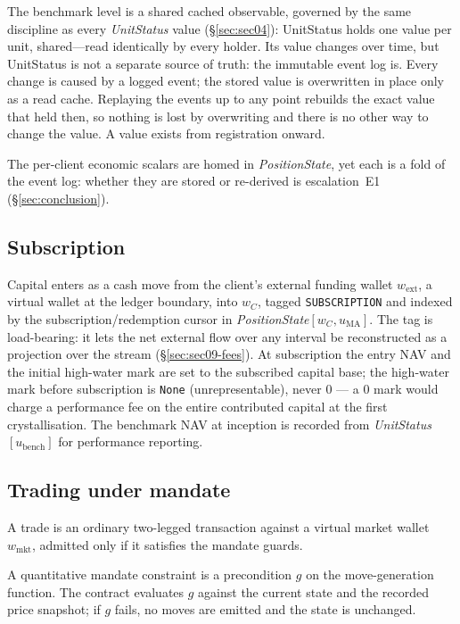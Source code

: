 The benchmark level is a shared cached observable, governed by the same discipline as every
\textit{UnitStatus} value (\S\ref{sec:sec04}): UnitStatus holds one value per unit, shared---read identically by every holder. Its value changes over time, but UnitStatus is not a separate
source of truth: the immutable event log is. Every change is caused by a logged event; the stored
value is overwritten in place only as a read cache. Replaying the events up to any point rebuilds
the exact value that held then, so nothing is lost by overwriting and there is no other way to
change the value. A value exists from registration onward.

The per-client economic scalars are homed in \textit{PositionState}, yet each is a fold of the
event log: whether they are stored or re-derived is escalation~E1 (\S\ref{sec:conclusion}).

\subsection{Subscription}
\label{sec:sec09-subscription}

Capital enters as a cash move from the client's external funding wallet $w_{\text{ext}}$, a
virtual wallet at the ledger boundary, into $w_C$, tagged \texttt{SUBSCRIPTION} and indexed by the
subscription/redemption cursor in \textit{PositionState}$[w_C,u_{\mathrm{MA}}]$. The tag is
load-bearing: it lets the net external flow over any interval be reconstructed as a projection
over the stream (\S\ref{sec:sec09-fees}). At subscription the entry NAV and the initial high-water
mark are set to the subscribed capital base; the high-water mark before subscription is
\texttt{None} (unrepresentable), never $0$ --- a $0$ mark would charge a performance fee on the
entire contributed capital at the first crystallisation. The benchmark NAV at inception is
recorded from \textit{UnitStatus}$[u_{\mathrm{bench}}]$ for performance reporting.

\subsection{Trading under mandate}
\label{sec:sec09-trading}

A trade is an ordinary two-legged transaction against a virtual market wallet $w_{\text{mkt}}$,
admitted only if it satisfies the mandate guards.

\begin{definition}
A quantitative mandate constraint is a precondition $g$ on the move-generation function. The
contract evaluates $g$ against the current state and the recorded price snapshot; if $g$ fails, no
moves are emitted and the state is unchanged.
\end{definition}

